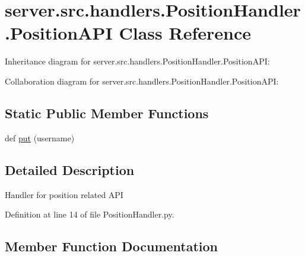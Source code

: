 \hypertarget{classserver_1_1src_1_1handlers_1_1_position_handler_1_1_position_a_p_i}{}\section{server.\+src.\+handlers.\+Position\+Handler.\+Position\+A\+PI Class Reference}
\label{classserver_1_1src_1_1handlers_1_1_position_handler_1_1_position_a_p_i}


Inheritance diagram for server.\+src.\+handlers.\+Position\+Handler.\+Position\+A\+PI\+:


Collaboration diagram for server.\+src.\+handlers.\+Position\+Handler.\+Position\+A\+PI\+:
\subsection*{Static Public Member Functions}
\begin{DoxyCompactItemize}
\item 
def \hyperlink{classserver_1_1src_1_1handlers_1_1_position_handler_1_1_position_a_p_i_ac4096c2002ea87bf622b41eb5fae7e8a}{put} (username)
\end{DoxyCompactItemize}


\subsection{Detailed Description}
\begin{DoxyVerb}Handler for position related API\end{DoxyVerb}
 

Definition at line 14 of file Position\+Handler.\+py.



\subsection{Member Function Documentation}
